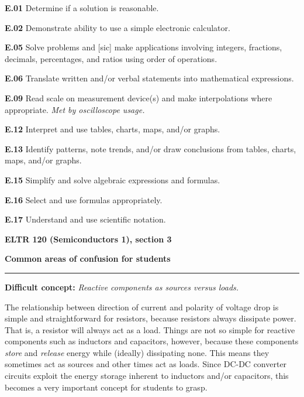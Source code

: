 \item{\bf E.01} Determine if a solution is reasonable.
\item{\bf E.02} Demonstrate ability to use a simple electronic calculator.
\item{\bf E.05} Solve problems and [sic] make applications involving integers, fractions, decimals, percentages, and ratios using order of operations.
\item{\bf E.06} Translate written and/or verbal statements into mathematical expressions.
\item{\bf E.09} Read scale on measurement device(s) and make interpolations where appropriate.  {\it Met by oscilloscope usage.}
\item{\bf E.12} Interpret and use tables, charts, maps, and/or graphs.
\item{\bf E.13} Identify patterns, note trends, and/or draw conclusions from tables, charts, maps, and/or graphs.
\item{\bf E.15} Simplify and solve algebraic expressions and formulas.
\item{\bf E.16} Select and use formulas appropriately.
\item{\bf E.17} Understand and use scientific notation.
\medskip





\vfil \eject

\centerline{\bf ELTR 120 (Semiconductors 1), section 3} \bigskip 
 
\vskip 10pt

\noindent
{\bf Common areas of confusion for students}

\vskip 5pt

\hrule \vskip 5pt

\vskip 10pt

\noindent
{\bf Difficult concept: } {\it Reactive components as sources versus loads.}

The relationship between direction of current and polarity of voltage drop is simple and straightforward for resistors, because resistors always dissipate power.  That is, a resistor will always act as a load.  Things are not so simple for reactive components such as inductors and capacitors, however, because these components {\it store} and {\it release} energy while (ideally) dissipating none.  This means they sometimes act as sources and other times act as loads.  Since DC-DC converter circuits exploit the energy storage inherent to inductors and/or capacitors, this becomes a very important concept for students to grasp.


